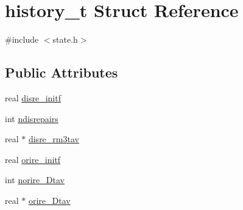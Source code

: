 \hypertarget{structhistory__t}{\section{history\-\_\-t \-Struct \-Reference}
\label{structhistory__t}
}


{\ttfamily \#include $<$state.\-h$>$}

\subsection*{\-Public \-Attributes}
\begin{DoxyCompactItemize}
\item 
real \hyperlink{structhistory__t_a9a140a386e26d62b1d6fb96127791140}{disre\-\_\-initf}
\item 
int \hyperlink{structhistory__t_ade4cea80c99fef9a3181bc0958c9abbb}{ndisrepairs}
\item 
real $\ast$ \hyperlink{structhistory__t_acf32d76997e1ed9577acbbb4badb05f9}{disre\-\_\-rm3tav}
\item 
real \hyperlink{structhistory__t_a6047d3a9ba6318f77225bb5da2c92b40}{orire\-\_\-initf}
\item 
int \hyperlink{structhistory__t_a5fcbe47e5c94a73fae166b5961a9b1c5}{norire\-\_\-\-Dtav}
\item 
real $\ast$ \hyperlink{structhistory__t_a587f9595a1e82da9ebc3be38316ef317}{orire\-\_\-\-Dtav}
\end{DoxyCompactItemize}


